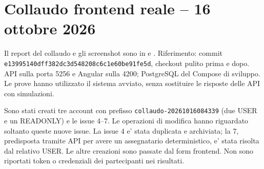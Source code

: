 \documentclass[11pt,a4paper,oneside]{report}
\begin{document}
\section{Collaudo frontend reale -- 16 ottobre 2026}
Il report del collaudo e gli screenshot sono in
 e .
Riferimento: commit \texttt{e13995140dff382dc3d548208c6c1e60be91fe5d},
checkout pulito prima e dopo. API sulla porta 5256 e Angular sulla 4200;
PostgreSQL del Compose di sviluppo. Le prove hanno utilizzato il sistema
avviato, senza sostituire le risposte delle API con simulazioni.

Sono stati creati tre account con prefisso
\texttt{collaudo-20261016084339} (due USER e un READONLY) e le issue 4--7.
Le operazioni di modifica hanno riguardato soltanto queste nuove issue.
La issue 4 e' stata duplicata e archiviata; la 7, predisposta tramite API
per avere un assegnatario deterministico, e' stata risolta dal relativo USER.
Le altre creazioni sono passate dal form frontend. Non sono riportati
token o credenziali dei partecipanti nei risultati.
\end{document}
